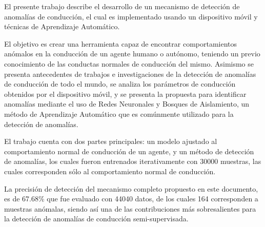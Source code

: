 \bigskip
El presente trabajo describe el desarrollo de un mecanismo de detecci\'{o}n de anomal\'{i}as de conducci\'{o}n, el cual es implementado usando un dispositivo m\'{o}vil y t\'{e}cnicas de Aprendizaje Autom\'{a}tico. 

El objetivo es crear una herramienta capaz de encontrar comportamientos an\'{o}malos en la conducci\'{o}n de un agente humano o aut\'{o}nomo, teniendo un previo conocimiento de las conductas normales de conducci\'{o}n del mismo. Asimismo se presenta antecedentes de trabajos e investigaciones de la detecci\'{o}n de anomal\'{i}as de conducci\'{o}n de todo el mundo, se analiza los par\'{a}metros de conducci\'{o}n obtenidos por el dispositivo m\'{o}vil, y se presenta la propuesta para identificar anomal\'{i}as mediante el uso de Redes Neuronales y Bosques de Aislamiento, un m\'{e}todo de Aprendizaje Autom\'{a}tico que es com\'{u}nmente utilizado para la detecci\'{o}n de anomal\'{i}as.

El trabajo cuenta con dos partes principales: un modelo ajustado al comportamiento normal de conducci\'{o}n de un agente, y un m\'{e}todo de detecci\'{o}n de anomal\'{i}as, los cuales fueron entrenados iterativamente con 30000 muestras, las cuales corresponden s\'{o}lo al comportamiento normal de conducci\'{o}n.

La precisi\'{o}n de detecci\'{o}n del mecanismo completo propuesto en este documento, es de 67.68\% que fue evaluado con 44040 datos, de los cuales 164 corresponden a muestras an\'{o}malas, siendo as\'{i} una de las contribuciones m\'{a}s sobresalientes para la detecci\'{o}n de anomal\'{i}as de conducci\'{o}n semi-supervisada.


